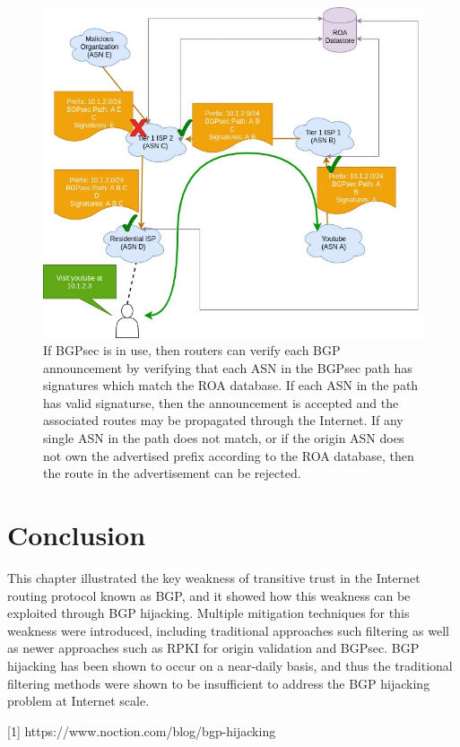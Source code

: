\documentclass[conference]{IEEEtran}
\begin{document}
\begin{figure}
  \includegraphics[width=\linewidth]{images/bgpsec-ops.jpg}
  \caption{If BGPsec is in use, then routers can verify each BGP announcement by verifying that each ASN in the BGPsec path has signatures which match the ROA database.  If each ASN in the path has valid signaturse, then the announcement is accepted and the associated routes may be propagated through the Internet.  If any single ASN in the path does not match, or if the origin ASN does not own the advertised prefix according to the ROA database, then the route in the advertisement can be rejected.}
  \label{fig:bgpsec-ops}
\end{figure}

\section{Conclusion}
This chapter illustrated the key weakness of transitive trust in the Internet routing protocol known as BGP, and it showed how this weakness can be exploited through BGP hijacking.  Multiple mitigation techniques for this weakness were introduced, including traditional approaches such filtering as well as newer approaches such as RPKI for origin validation and BGPsec.  BGP hijacking has been shown to occur on a near-daily basis, and thus the traditional filtering methods were shown to be insufficient to address the BGP hijacking problem at Internet scale.


[1] https://www.noction.com/blog/bgp-hijacking
\end{document}
